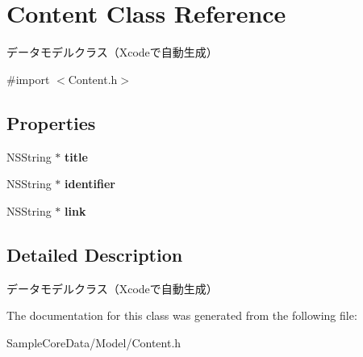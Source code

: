\hypertarget{interface_content}{\section{Content Class Reference}
\label{interface_content}
}


データモデルクラス（\-Xcodeで自動生成）  




{\ttfamily \#import $<$Content.\-h$>$}

\subsection*{Properties}
\begin{DoxyCompactItemize}
\item 
\hypertarget{interface_content_a18b0e4b54d08ac0a4224f1ccd3ac5edd}{N\-S\-String $\ast$ {\bfseries title}}\label{interface_content_a18b0e4b54d08ac0a4224f1ccd3ac5edd}

\item 
\hypertarget{interface_content_a304369fca133bdf17de63b9ba5befb1d}{N\-S\-String $\ast$ {\bfseries identifier}}\label{interface_content_a304369fca133bdf17de63b9ba5befb1d}

\item 
\hypertarget{interface_content_a06a54d7011f8e2393eb1e4eff6a3cbf0}{N\-S\-String $\ast$ {\bfseries link}}\label{interface_content_a06a54d7011f8e2393eb1e4eff6a3cbf0}

\end{DoxyCompactItemize}


\subsection{Detailed Description}
データモデルクラス（\-Xcodeで自動生成） 

The documentation for this class was generated from the following file\-:\begin{DoxyCompactItemize}
\item 
Sample\-Core\-Data/\-Model/Content.\-h\end{DoxyCompactItemize}
